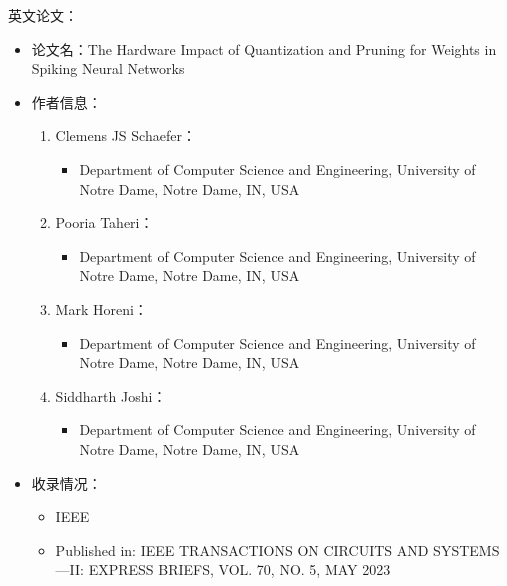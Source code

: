 英文论文：
\begin{itemize}
    \item 论文名：The Hardware Impact of Quantization and Pruning for Weights in Spiking Neural Networks
    \item 作者信息：
        \begin{enumerate}
            \begin{enumerate}
                \item Clemens JS Schaefer：
                    \begin{itemize}
                        \item Department of Computer Science and Engineering, University of Notre Dame, Notre Dame, IN, USA
                    \end{itemize}
                \item Pooria Taheri：
                    \begin{itemize}
                        \item Department of Computer Science and Engineering, University of Notre Dame, Notre Dame, IN, USA
                    \end{itemize}
                \item Mark Horeni：
                    \begin{itemize}
                        \item Department of Computer Science and Engineering, University of Notre Dame, Notre Dame, IN, USA
                    \end{itemize}
                \item Siddharth Joshi：
                    \begin{itemize}
                        \item Department of Computer Science and Engineering, University of Notre Dame, Notre Dame, IN, USA
                    \end{itemize}
            \end{enumerate}
        \end{enumerate}

    \item 收录情况：
        \begin{itemize}
            \item IEEE
            \item Published in: IEEE TRANSACTIONS ON CIRCUITS AND SYSTEMS—II: EXPRESS BRIEFS, VOL. 70, NO. 5, MAY 2023
        \end{itemize}


\end{itemize}
